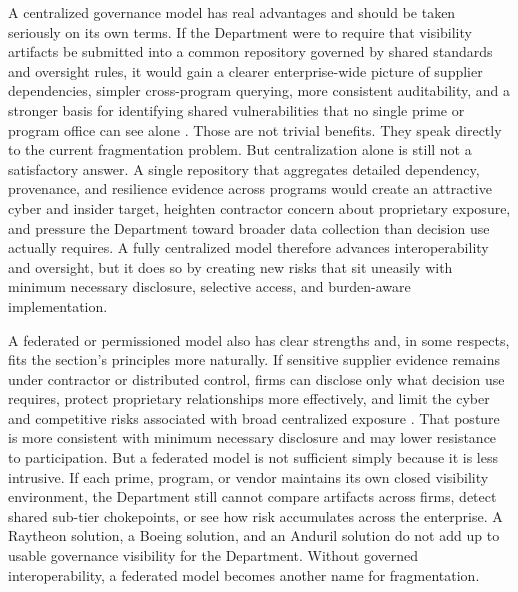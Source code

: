 A centralized governance model has real advantages and should be taken seriously on its own terms. If the Department were to require that visibility artifacts be submitted into a common repository governed by shared standards and oversight rules, it would gain a clearer enterprise-wide picture of supplier dependencies, simpler cross-program querying, more consistent auditability, and a stronger basis for identifying shared vulnerabilities that no single prime or program office can see alone \parencite{ch5_nist800161r1upd1,ch5_dbb2025_illumination,U.S.GovernmentAccountabilityOffice2025,ch5_farsubpart423}. Those are not trivial benefits. They speak directly to the current fragmentation problem. But centralization alone is still not a satisfactory answer. A single repository that aggregates detailed dependency, provenance, and resilience evidence across programs would create an attractive cyber and insider target, heighten contractor concern about proprietary exposure, and pressure the Department toward broader data collection than decision use actually requires. A fully centralized model therefore advances interoperability and oversight, but it does so by creating new risks that sit uneasily with minimum necessary disclosure, selective access, and burden-aware implementation.

A federated or permissioned model also has clear strengths and, in some respects, fits the section's principles more naturally. If sensitive supplier evidence remains under contractor or distributed control, firms can disclose only what decision use requires, protect proprietary relationships more effectively, and limit the cyber and competitive risks associated with broad centralized exposure \parencite{ch5_nist800161r1upd1,ch5_dscsa_interop_2023,ch5_ntia_sbom_2021,ch5_nist_ir_8419}. That posture is more consistent with minimum necessary disclosure and may lower resistance to participation. But a federated model is not sufficient simply because it is less intrusive. If each prime, program, or vendor maintains its own closed visibility environment, the Department still cannot compare artifacts across firms, detect shared sub-tier chokepoints, or see how risk accumulates across the enterprise. A Raytheon solution, a Boeing solution, and an Anduril solution do not add up to usable governance visibility for the Department. Without governed interoperability, a federated model becomes another name for fragmentation.

